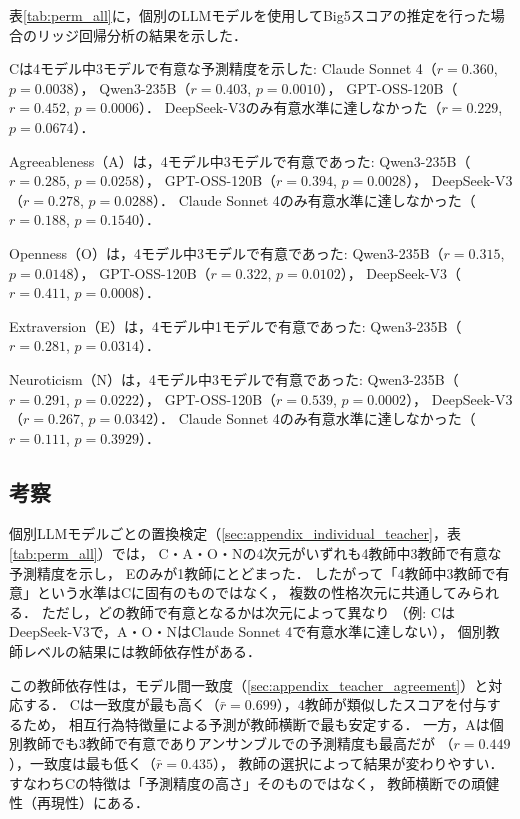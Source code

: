 \documentclass[dvipdfmx,11pt,a4paper]{bxjsarticle}
\renewcommand{\_}{\paperorigunderscore\allowbreak}%
\begin{document}
表\ref{tab:perm_all}に，個別のLLMモデルを使用してBig5スコアの推定を行った場合のリッジ回帰分析の結果を示した．

\begin{table}[htbp]
\centering
\caption{個別モデルの置換検定結果
  観測相関係数$r_{\text{obs}}$（$p$値）．太字は$p < 0.05$を示す．}
\label{tab:perm_all}

\end{table}

Cは4モデル中3モデルで有意な予測精度を示した:
Claude Sonnet 4（$r = 0.360$, $p = 0.0038$），
Qwen3-235B（$r = 0.403$, $p = 0.0010$），
GPT-OSS-120B（$r = 0.452$, $p = 0.0006$）．
DeepSeek-V3のみ有意水準に達しなかった（$r = 0.229$, $p = 0.0674$）．

Agreeableness（A）は，4モデル中3モデルで有意であった:
Qwen3-235B（$r = 0.285$, $p = 0.0258$），
GPT-OSS-120B（$r = 0.394$, $p = 0.0028$），
DeepSeek-V3（$r = 0.278$, $p = 0.0288$）．
Claude Sonnet 4のみ有意水準に達しなかった（$r = 0.188$, $p = 0.1540$）．

Openness（O）は，4モデル中3モデルで有意であった:
Qwen3-235B（$r = 0.315$, $p = 0.0148$），
GPT-OSS-120B（$r = 0.322$, $p = 0.0102$），
DeepSeek-V3（$r = 0.411$, $p = 0.0008$）．

Extraversion（E）は，4モデル中1モデルで有意であった:
Qwen3-235B（$r = 0.281$, $p = 0.0314$）．

Neuroticism（N）は，4モデル中3モデルで有意であった:
Qwen3-235B（$r = 0.291$, $p = 0.0222$），
GPT-OSS-120B（$r = 0.539$, $p = 0.0002$），
DeepSeek-V3（$r = 0.267$, $p = 0.0342$）．
Claude Sonnet 4のみ有意水準に達しなかった（$r = 0.111$, $p = 0.3929$）．

\subsection{考察}

個別LLMモデルごとの置換検定（\ref{sec:appendix_individual_teacher}，表\ref{tab:perm_all}）では，
C・A・O・Nの4次元がいずれも4教師中3教師で有意な予測精度を示し，
Eのみが1教師にとどまった．
したがって「4教師中3教師で有意」という水準はCに固有のものではなく，
複数の性格次元に共通してみられる．
ただし，どの教師で有意となるかは次元によって異なり
（例: CはDeepSeek-V3で，A・O・NはClaude Sonnet 4で有意水準に達しない），
個別教師レベルの結果には教師依存性がある．

この教師依存性は，モデル間一致度（\ref{sec:appendix_teacher_agreement}）と対応する．
Cは一致度が最も高く（$\bar{r} = 0.699$），4教師が類似したスコアを付与するため，
相互行為特徴量による予測が教師横断で最も安定する．
一方，Aは個別教師でも3教師で有意でありアンサンブルでの予測精度も最高だが
（$r = 0.449$），一致度は最も低く（$\bar{r} = 0.435$），
教師の選択によって結果が変わりやすい．
すなわちCの特徴は「予測精度の高さ」そのものではなく，
教師横断での頑健性（再現性）にある．
\end{document}
